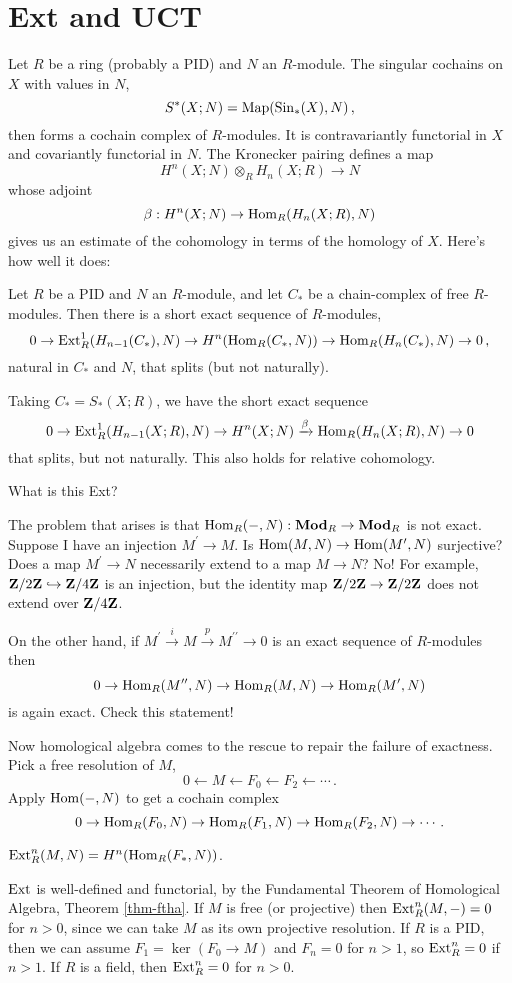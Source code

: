 \section{Ext and UCT}
Let $R$ be a ring (probably a PID) and $N$ an $R$-module. The singular cochains
on $X$ with values in $N$, 
\[S^\ast(X;N)=\operatorname{Map}(\mathrm{Sin}_\ast(X),N)\,,
\]
then forms a cochain complex of $R$-modules. It is contravariantly functorial
in $X$ and covariantly functorial in $N$. The Kronecker pairing defines a map
\[
H^n(X;N)\otimes_R H_n(X;R)\to N
\]
whose adjoint 
\[
\beta:H^n(X;N)\rightarrow\operatorname{Hom}_R( H_n(X;R),N)
\]
gives us an estimate of the cohomology in terms of the homology of $X$. 
Here's how well it does:
\begin{theorem}
\label{thm-mvuct}
Let $R$ be a PID and $N$ an $R$-module, and let $C_*$ 
be a chain-complex of free $R$-modules. Then there is a short exact sequence
of $R$-modules,
\[
0\to\operatorname{Ext}_R^1(H_{n-1}(C_*),N)\to H^n(\operatorname{Hom}_R(C_*,N))\to\operatorname{Hom}_R(H_n(C_*),N)\to0\,,
\]
natural in $C_*$ and $N$, that splits (but not naturally). 
\end{theorem}
Taking $C_*=S_*(X;R)$, we have the short exact sequence
\begin{equation*}
0\to\operatorname{Ext}^1_R( H_{n-1}(X;R),N)\to H^n(X;N)\xrightarrow{\beta}\operatorname{Hom}_R( H_n(X;R),N)\to 0
\end{equation*}
that splits, but not naturally. This also holds for relative cohomology.

What is this Ext?

The problem that arises is that $\operatorname{Hom}_R(-,N):\mathbf{Mod}_R\to\mathbf{Mod}_R$ is not exact. 
Suppose I have an injection $M^\prime\to M$. Is $\operatorname{Hom}(M,N)\to\operatorname{Hom}(M^\prime,N)$ surjective? Does a map $M^\prime\to N$ necessarily extend to a map $M\to N$? No! For example, $\mathbf Z/2\mathbf Z\hookrightarrow\mathbf Z/4\mathbf Z$ is an injection, but the identity
map $\mathbf Z/2\mathbf Z\to\mathbf Z/2\mathbf Z$ does not extend over $\mathbf Z/4\mathbf Z$. 

On the other hand, if $M^\prime\xrightarrow{i} M\xrightarrow{p} M^{\prime\prime}\to 0$ is an exact sequence of $R$-modules then 
\[
0\to \operatorname{Hom}_R(M^{\prime\prime},N)\to\operatorname{Hom}_R(M,N)\to \operatorname{Hom}_R(M^{\prime},N)
\]
is again exact. Check this statement! 

Now homological algebra comes to the rescue to repair the failure of exactness. Pick a free resolution of $M$,
\[
0\leftarrow M\leftarrow F_0\leftarrow F_2\leftarrow\cdots\,.
\]
Apply $\operatorname{Hom}(-,N)$ to get a cochain complex 
\[
0\to \operatorname{Hom}_R(F_0,N)\to \operatorname{Hom}_R(F_1,N)\to \operatorname{Hom}_R(F_2,N)\to\cdots\,.
\]
\begin{definition} 
$\operatorname{Ext}_R^n(M,N)= H^n(\operatorname{Hom}_R(F_\ast,N))$.
\end{definition}
\begin{remark}
$\operatorname{Ext}$ is well-defined and functorial, by the Fundamental Theorem of Homological Algebra, Theorem \ref{thm-ftha}. If $M$ is free (or projective) then $\operatorname{Ext}_R^n(M,-)=0$ for $n>0$, since we can take $M$ as its own projective resolution. If $R$ is a PID, then we can assume $F_1=\ker(F_0\to M)$ and $F_n=0$ for $n>1$, so $\operatorname{Ext}_R^n=0$ if $n>1$. If $R$ is a field, then $\operatorname{Ext}_R^n=0$ for $n>0$. 
\end{remark}

